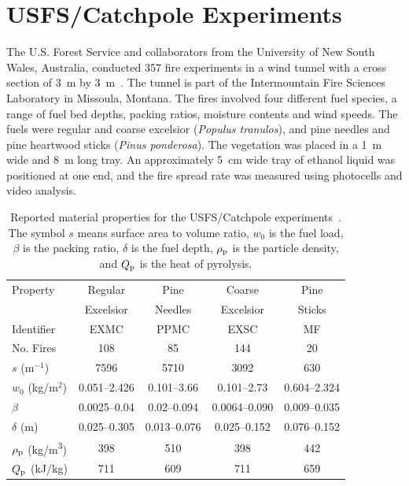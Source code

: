 \section{USFS/Catchpole Experiments}
\label{USFS_Catchpole_Description}

The U.S. Forest Service and collaborators from the University of New South Wales, Australia, conducted 357 fire experiments in a wind tunnel with a cross section of 3~m by 3~m~\cite{Catchpole:CST1998}. The tunnel is part of the Intermountain Fire Sciences Laboratory in Missoula, Montana. The fires involved four different fuel species, a range of fuel bed depths, packing ratios, moisture contents and wind speeds. The fuels were regular and coarse excelsior ({\em Populus tranulos}), and pine needles and pine heartwood sticks ({\em Pinus ponderosa}). The vegetation was placed in a 1~m wide and 8~m long tray. An approximately 5~cm wide tray of ethanol liquid was positioned at one end, and the fire spread rate was measured using photocells and video analysis.

\begin{table}[ht!]
\centering
\caption[Material properties for the USFS/Catchpole experiments]
{Reported material properties for the USFS/Catchpole experiments~\cite{Catchpole:CST1998}. The symbol $s$ means surface area to volume ratio, $w_0$ is the fuel load, $\beta$ is the packing ratio, $\delta$ is the fuel depth, $\rho_{\rm p}$ is the particle density, and $Q_{\rm p}$ is the heat of pyrolysis.}
\label{Catchpole_Parameters}
\begin{tabular}{|l|c|c|c|c|}
\hline
Property                  & Regular       & Pine         & Coarse         & Pine           \\
                          & Excelsior     & Needles      & Excelsior      & Sticks         \\ \hline \hline
Identifier                & EXMC          & PPMC         & EXSC           & MF             \\ \hline
No. Fires                 & 108           & 85           & 144            & 20             \\ \hline
$s$ (m$^{-1}$)            & 7596          & 5710         & 3092           & 630            \\ \hline
$w_0$ (kg/m$^2$)          & 0.051--2.426  & 0.101--3.66  & 0.101--2.73    & 0.604--2.324   \\ \hline
$\beta$                   & 0.0025--0.04  & 0.02--0.094  & 0.0064--0.090  & 0.009--0.035   \\ \hline
$\delta$ (m)              & 0.025--0.305  & 0.013--0.076 & 0.025--0.152   & 0.076--0.152   \\ \hline
$\rho_{\rm p}$ (\unit{kg/m^3}) & 398      & 510          & 398            & 442            \\ \hline
$Q_{\rm p}$ (kJ/kg)       & 711           & 609          & 711            & 659            \\ \hline
\end{tabular}
\end{table}

